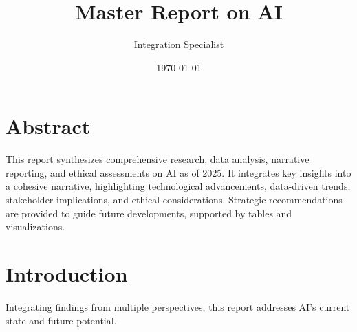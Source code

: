 \documentclass{article}%
\title{Master Report on AI}%
\author{Integration Specialist}%
\date{\today}%
\begin{document}
%
\normalsize%
\maketitle%
\section{Abstract}%
\label{sec:Abstract}%
This report synthesizes comprehensive research, data analysis, narrative reporting, and ethical assessments on AI as of 2025. It integrates key insights into a cohesive narrative, highlighting technological advancements, data{-}driven trends, stakeholder implications, and ethical considerations. Strategic recommendations are provided to guide future developments, supported by tables and visualizations.

%
\tableofcontents%
\newpage%
\section{Introduction}%
\label{sec:Introduction}%
Integrating findings from multiple perspectives, this report addresses AI's current state and future potential.

%
\end{document}
